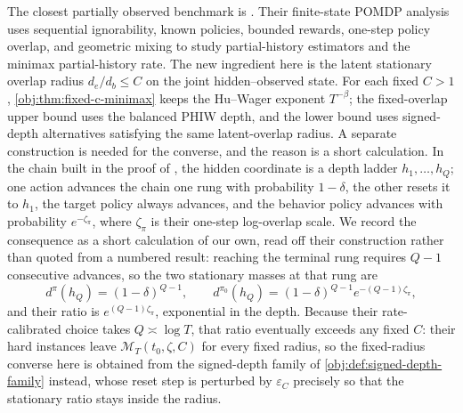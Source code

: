 The closest partially observed benchmark is \citet[Model 3 and Theorems 2.1, 3.1]{HuWager2023}. Their finite-state POMDP analysis uses sequential ignorability, known policies, bounded rewards, one-step policy overlap, and geometric mixing to study partial-history estimators and the minimax partial-history rate. The new ingredient here is the latent stationary overlap radius \(d_e/d_b\le C\) on the joint hidden--observed state. For each fixed \(C>1\), \cref{obj:thm:fixed-c-minimax} keeps the Hu--Wager exponent \(T^{-\beta}\); the fixed-overlap upper bound uses the balanced PHIW depth, and the lower bound uses signed-depth alternatives satisfying the same latent-overlap radius. A separate construction is needed for the converse, and the reason is a short calculation. In the chain built in the proof of \citet[Theorem 3.1]{HuWager2023}, the hidden coordinate is a depth ladder \(h_1,\ldots,h_Q\); one action advances the chain one rung with probability \(1-\delta\), the other resets it to \(h_1\), the target policy always advances, and the behavior policy advances with probability \(e^{-\zeta_\pi}\), where \(\zeta_\pi\) is their one-step log-overlap scale. We record the consequence as a short calculation of our own, read off their construction rather than quoted from a numbered result: reaching the terminal rung requires \(Q-1\) consecutive advances, so the two stationary masses at that rung are
\[
d^{\pi}(h_Q)=(1-\delta)^{Q-1},
\qquad
d^{\pi_0}(h_Q)=(1-\delta)^{Q-1}e^{-(Q-1)\zeta_\pi},
\]
and their ratio is \(e^{(Q-1)\zeta_\pi}\), exponential in the depth. Because their rate-calibrated choice takes \(Q\asymp\log T\), that ratio eventually exceeds any fixed \(C\): their hard instances leave \(\mathcal M_T(t_0,\zeta,C)\) for every fixed radius, so the fixed-radius converse here is obtained from the signed-depth family of \cref{obj:def:signed-depth-family} instead, whose reset step is perturbed by \(\varepsilon_C\) precisely so that the stationary ratio stays inside the radius.

